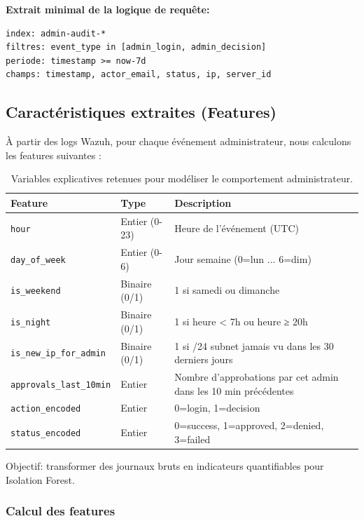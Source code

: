 \textbf{Extrait minimal de la logique de requête:}
\begin{verbatim}
index: admin-audit-*
filtres: event_type in [admin_login, admin_decision]
periode: timestamp >= now-7d
champs: timestamp, actor_email, status, ip, server_id
\end{verbatim}

\subsection{Caractéristiques extraites (Features)}

À partir des logs Wazuh, pour chaque événement administrateur, nous calculons les features suivantes :

\begin{table}[h]
\centering
\begin{tabularx}{\textwidth}{|l|l|p{6.5cm}|}
\hline
\textbf{Feature} & \textbf{Type} & \textbf{Description} \\
\hline
\texttt{hour} & Entier (0-23) & Heure de l'événement (UTC) \\
\hline
\texttt{day\_of\_week} & Entier (0-6) & Jour semaine (0=lun ... 6=dim) \\
\hline
\texttt{is\_weekend} & Binaire (0/1) & 1 si samedi ou dimanche \\
\hline
\texttt{is\_night} & Binaire (0/1) & 1 si heure < 7h ou heure ≥ 20h \\
\hline
\texttt{is\_new\_ip\_for\_admin} & Binaire (0/1) & 1 si /24 subnet jamais vu dans les 30 derniers jours \\
\hline
\texttt{approvals\_last\_10min} & Entier & Nombre d'approbations par cet admin dans les 10 min précédentes \\
\hline
\texttt{action\_encoded} & Entier & 0=login, 1=decision \\
\hline
\texttt{status\_encoded} & Entier & 0=success, 1=approved, 2=denied, 3=failed \\
\hline
\end{tabularx}
\caption{Variables explicatives retenues pour modéliser le comportement administrateur.}
\label{tab:features_anomalies_admin}
\end{table}

 Objectif: transformer des journaux bruts en indicateurs quantifiables pour Isolation Forest.

\subsubsection{Calcul des features}

